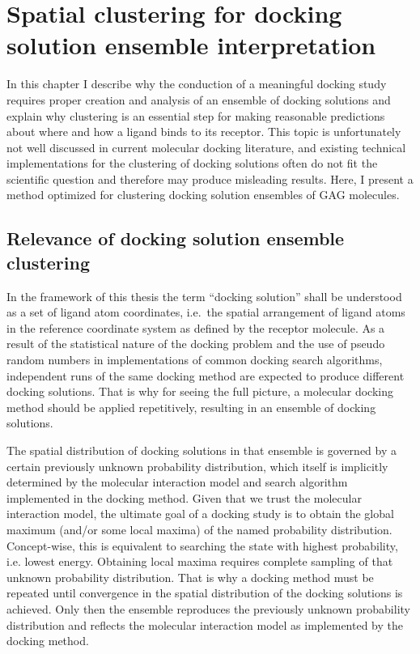 \chapter{Spatial clustering for docking solution ensemble interpretation}
\label{chapter:clustering}

In this chapter I describe why the conduction of a meaningful docking study
requires proper creation and analysis of an ensemble of docking solutions and
explain why clustering is an essential step for making reasonable predictions
about where and how a ligand binds to its receptor. This topic is unfortunately
not well discussed in current molecular docking literature, and existing
technical implementations for the clustering of docking solutions often do not
fit the scientific question and therefore may produce misleading results. Here,
I present a method optimized for clustering docking solution ensembles of GAG
molecules.

\section{Relevance of docking solution ensemble clustering}
\label{relevance_of_clustering}

In the framework of this thesis the term \enquote{docking solution} shall be
understood as a set of ligand atom coordinates, i.e.\ the spatial arrangement of
ligand atoms in the reference coordinate system as defined by the receptor
molecule. As a result of the statistical nature of the docking problem and the
use of pseudo random numbers in implementations of common docking search
algorithms, independent runs of the same docking method are expected to produce
different docking solutions. That is why for seeing the full picture, a
molecular docking method should be applied repetitively, resulting in an
ensemble of docking solutions.

The spatial distribution of docking solutions in that ensemble is governed by a
certain previously unknown probability distribution, which itself is implicitly
determined by the molecular interaction model and search algorithm implemented
in the docking method. Given that we trust the molecular interaction model, the
ultimate goal of a docking study is to obtain the global maximum (and/or some
local maxima) of the named probability distribution. Concept-wise, this is
equivalent to searching the state with highest probability, i.e. lowest energy.
Obtaining local maxima requires complete sampling of that unknown probability
distribution. That is why a docking method must be repeated until convergence
in the spatial distribution of the docking solutions is achieved. Only then the
ensemble reproduces the previously unknown probability distribution and reflects
the molecular interaction model as implemented by the docking method.

